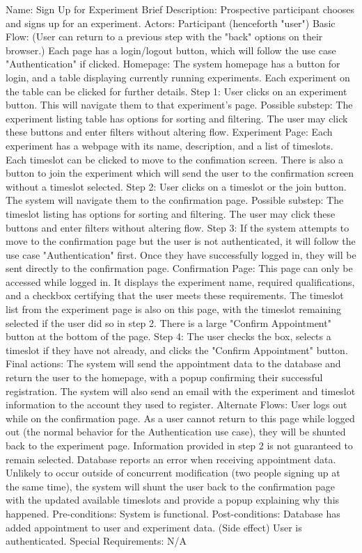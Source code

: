 \begin{outline}[enumerate]
\1 Name: Sign Up for Experiment
\2 Brief Description: Prospective participant chooses and signs up for an experiment.
\2 Actors: Participant (henceforth "user")
\2 Basic Flow: (User can return to a previous step with the "back" options on their browser.)  Each page has a login/logout button, which will follow the use case "Authentication" if clicked.
\3 Homepage: The system homepage has a button for login, and a table displaying currently running experiments.  Each experiment on the table can be clicked for further details.
\3 Step 1: User clicks on an experiment button.  This will navigate them to that experiment's page.
\4 Possible substep: The experiment listing table has options for sorting and filtering.  The user may click these buttons and enter filters without altering flow.
\3 Experiment Page: Each experiment has a webpage with its name, description, and a list of timeslots.  Each timeslot can be clicked to move to the confimation screen.  There is also a button to join the experiment which will send the user to the confirmation screen without a timeslot selected.
\3 Step 2: User clicks on a timeslot or the join button.  The system will navigate them to the confirmation page.
\4 Possible substep: The timeslot listing has options for sorting and filtering.  The user may click these buttons and enter filters without altering flow.
\3 Step 3: If the system attempts to move to the confirmation page but the user is not authenticated, it will follow the use case "Authentication" first.  Once they have successfully logged in, they will be sent directly to the confirmation page.
\3 Confirmation Page: This page can only be accessed while logged in.  It displays the experiment name, required qualifications, and a checkbox certifying that the user meets these requirements.  The timeslot list from the experiment page is also on this page, with the timeslot remaining selected if the user did so in step 2.  There is a large "Confirm Appointment" button at the bottom of the page.
\3 Step 4: The user checks the box, selects a timeslot if they have not already, and clicks the "Confirm Appointment" button.
\3 Final actions: The system will send the appointment data to the database and return the user to the homepage, with a popup confirming their successful registration.  The system will also send an email with the experiment and timeslot information to the account they used to register.
\2 Alternate Flows:
\3 User logs out while on the confirmation page.
\4 As a user cannot return to this page while logged out (the normal behavior for the Authentication use case), they will be shunted back to the experiment page.  Information provided in step 2 is not guaranteed to remain selected.
\3 Database reports an error when receiving appointment data.
\4 Unlikely to occur outside of concurrent modification (two people signing up at the same time), the system will shunt the user back to the confirmation page with the updated available timeslots and provide a popup explaining why this happened.
\2 Pre-conditions:
\3 System is functional.
\2 Post-conditions:
\3 Database has added appointment to user and experiment data.
\3 (Side effect) User is authenticated.
\2 Special Requirements:
\3 N/A




\end{outline}
